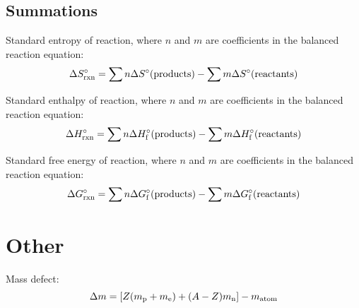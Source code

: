 \documentclass[10pt]{article}
\begin{document}
\subsection{Summations}

Standard entropy of reaction, where $n$ and $m$ are coefficients in the balanced reaction equation:
\begin{equation*}
\Delta S\not_\textnormal{rxn} = \sum{n\Delta S\not(\textnormal{products})}-\sum{m\Delta S\not(\textnormal{reactants})}
\end{equation*}

Standard enthalpy of reaction, where $n$ and $m$ are coefficients in the balanced reaction equation:
\begin{equation*}
\Delta H\not_\textnormal{rxn} = \sum{n\Delta H\not_\textnormal{f}(\textnormal{products})}-\sum{m\Delta H\not_\textnormal{f}(\textnormal{reactants})}
\end{equation*}

Standard free energy of reaction, where $n$ and $m$ are coefficients in the balanced reaction equation:
\begin{equation*}
\Delta G\not_\textnormal{rxn} = \sum{n\Delta G\not_\textnormal{f}(\textnormal{products})}-\sum{m\Delta G\not_\textnormal{f}(\textnormal{reactants})}
\end{equation*}




\newpage
\section{Other}

Mass defect:
\begin{equation*}
\Delta m = [Z(m_{\textnormal{p}}+m_\textnormal{e})+(A-Z)m_\textnormal{n}]-m_\textnormal{atom}
\end{equation*}
\end{document}
